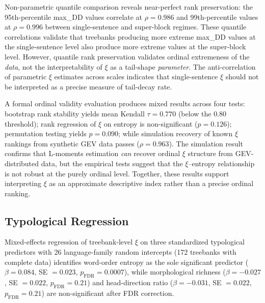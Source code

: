 \documentclass[11pt,letterpaper]{article}
\begin{document}
Non-parametric quantile comparison reveals near-perfect rank preservation: the 95th-percentile max\_DD values correlate at $\rho = 0.986$ and 99th-percentile values at $\rho = 0.996$ between single-sentence and super-block regimes. These quantile correlations validate that treebanks producing more extreme max\_DD values at the single-sentence level also produce more extreme values at the super-block level. However, quantile rank preservation validates ordinal extremeness of the \emph{data}, not the interpretability of $\xi$ as a tail-shape \emph{parameter}. The anti-correlation of parametric $\xi$ estimates across scales indicates that single-sentence $\xi$ should not be interpreted as a precise measure of tail-decay rate.

A formal ordinal validity evaluation produces mixed results across four tests: bootstrap rank stability yields mean Kendall $\tau = 0.770$ (below the 0.80 threshold); rank regression of $\xi$ on entropy is non-significant ($p = 0.126$); permutation testing yields $p = 0.090$; while simulation recovery of known $\xi$ rankings from synthetic GEV data passes ($\rho = 0.963$). The simulation result confirms that L-moments estimation \emph{can} recover ordinal $\xi$ structure from GEV-distributed data, but the empirical tests suggest that the $\xi$--entropy relationship is not robust at the purely ordinal level. Together, these results support interpreting $\xi$ as an approximate descriptive index rather than a precise ordinal ranking.

\subsection{Typological Regression}

Mixed-effects regression of treebank-level $\xi$ on three standardized typological predictors with 26 language-family random intercepts (172 treebanks with complete data) identifies word-order entropy as the sole significant predictor ($\beta = 0.084$, SE $= 0.023$, $p_{\text{FDR}} = 0.0007$), while morphological richness ($\beta = -0.027$, SE $= 0.022$, $p_{\text{FDR}} = 0.21$) and head-direction ratio ($\beta = -0.031$, SE $= 0.022$, $p_{\text{FDR}} = 0.21$) are non-significant after FDR correction.
\end{document}
